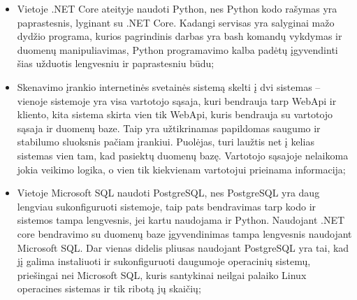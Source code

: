 \begin{itemize}
	\item Vietoje .NET Core ateityje naudoti Python, nes Python kodo rašymas yra paprastesnis, lyginant su .NET Core. Kadangi servisas yra salyginai mažo dydžio programa, kurios pagrindinis darbas yra bash komandų vykdymas ir duomenų manipuliavimas, Python programavimo kalba padėtų įgyvendinti šias užduotis lengvesniu ir paprastesniu būdu;
	\item Skenavimo įrankio internetinės svetainės sistemą skelti į dvi sistemas – vienoje sistemoje yra visa vartotojo sąsaja, kuri bendrauja tarp WebApi ir kliento, kita sistema skirta vien tik WebApi, kuris bendrauja su vartotojo sąsaja ir duomenų baze. Taip yra užtikrinamas papildomas saugumo ir stabilumo sluoksnis pačiam įrankiui. Puolėjas, turi laužtis net į kelias sistemas vien tam, kad pasiektų duomenų bazę. Vartotojo sąsajoje nelaikoma jokia veikimo logika, o vien tik kiekvienam vartotojui prieinama informacija;
	\item Vietoje Microsoft SQL naudoti PostgreSQL, nes PostgreSQL yra daug lengviau sukonfiguruoti sistemoje, taip pats bendravimas tarp kodo ir sistemos tampa lengvesnis, jei kartu naudojama ir Python. Naudojant .NET core bendravimo su duomenų baze įgyvendinimas tampa lengvesnis naudojant Microsoft SQL. Dar vienas didelis pliusas naudojant PostgreSQL yra tai, kad jį galima instaliuoti ir sukonfiguruoti daugumoje operacinių sistemų, priešingai nei Microsoft SQL, kuris santykinai neilgai palaiko Linux operacines sistemas ir tik ribotą jų skaičių;{\tiny }
\end{itemize}















